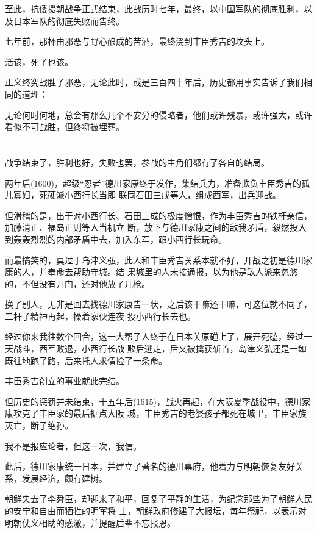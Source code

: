 \documentclass[11pt,a4paper,onecolumn]{article}
\begin{document}
至此，抗倭援朝战争正式结束，此战历时七年，最终，以中国军队的彻底胜利，以及日本军队的彻底失败而告终。

七年前，那杯由邪恶与野心酿成的苦酒，最终浇到丰臣秀吉的坟头上。

活该，死了也该。

正义终究战胜了邪恶，无论此时，或是三百四十年后，历史都用事实告诉了我们相同的道理：

无论何时何地，总会有那么几个不安分的侵略者，他们或许残暴，或许强大，或许看似不可战胜，但终将被埋葬。

\section[\thesection]{}

战争结束了，胜利也好，失败也罢，参战的主角们都有了各自的结局。

两年后(1600)，超级``忍者''德川家康终于发作，集结兵力，准备欺负丰臣秀吉的孤儿寡妇，死硬派小西行长当即
联同石田三成等人，组成西军，出兵迎战。

但滑稽的是，出于对小西行长、石田三成的极度憎恨，作为丰臣秀吉的铁杆亲信，加藤清正、福岛正则等人当机立
断，放下与德川家康之间的敌我矛盾，毅然投入到轰轰烈烈的内部矛盾中去，加入东军，跟小西行长玩命。

而最搞笑的，莫过于岛津义弘，此人和丰臣秀吉关系本就不好，开战之初是德川家康的人，并奉命去帮助守城。结
果城里的人未接通报，以为他是敌人派来忽悠的，不但没有开门，还对他放了几枪。

换了别人，无非是回去找德川家康告一状，之后该干嘛还干嘛，可这位就不同了，二杆子精神再起，操着家伙连夜
投小西行长去也。

经过你来我往数个回合，这一大帮子人终于在日本关原碰上了，展开死磕，经过一天战斗，西军败退，小西行长战
败后逃走，后又被擒获斩首，岛津义弘还是一如既往地跑了路，后来托人求情捡了一条命。

丰臣秀吉创立的事业就此完结。

但历史的惩罚并未结束，十五年后(1615)，战火再起，在大阪夏季战役中，德川家康攻克了丰臣家的最后据点大阪
城，丰臣秀吉的老婆孩子都死在城里，丰臣家族灭亡，断子绝孙。

我不是报应论者，但这一次，我信。

此后，德川家康统一日本，并建立了著名的德川幕府，他着力与明朝恢复友好关系，发展经济，颇有建树。

朝鲜失去了李舜臣，却迎来了和平，回复了平静的生活，为纪念那些为了朝鲜人民的安宁和自由而牺牲的明军将
士，朝鲜政府修建了大报坛，每年祭祀，以表示对明朝仗义相助的感激，并提醒后辈不忘报恩。
\end{document}
